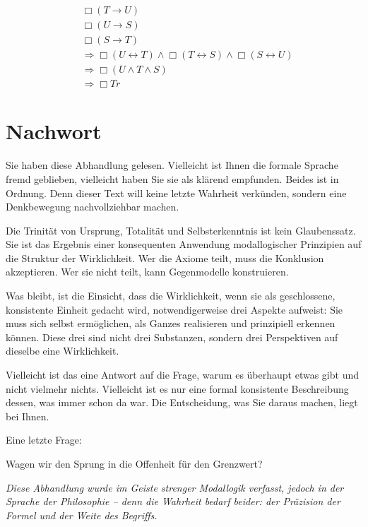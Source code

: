 \documentclass[
]{article}
\begin{document}
\[
\begin{aligned}
& \Box(T \rightarrow U) \\
& \Box(U \rightarrow S) \\
& \Box(S \rightarrow T) \\
& \Rightarrow \Box(U \leftrightarrow T) \land \Box(T \leftrightarrow S) \land \Box(S \leftrightarrow U) \\
& \Rightarrow \Box(U \land T \land S) \\
& \Rightarrow \Box Tr
\end{aligned}
\]

\section{Nachwort}\label{nachwort}

Sie haben diese Abhandlung gelesen. Vielleicht ist Ihnen die formale Sprache fremd geblieben, vielleicht haben Sie sie als klärend empfunden. Beides ist in Ordnung. Denn dieser Text will keine letzte Wahrheit verkünden, sondern eine Denkbewegung nachvollziehbar machen.

Die Trinität von Ursprung, Totalität und Selbsterkenntnis ist kein Glaubenssatz. Sie ist das Ergebnis einer konsequenten Anwendung modallogischer Prinzipien auf die Struktur der Wirklichkeit. Wer die Axiome teilt, muss die Konklusion akzeptieren. Wer sie nicht teilt, kann Gegenmodelle konstruieren.

Was bleibt, ist die Einsicht, dass die Wirklichkeit, wenn sie als geschlossene, konsistente Einheit gedacht wird, notwendigerweise drei Aspekte aufweist: Sie muss sich selbst ermöglichen, als Ganzes realisieren und prinzipiell erkennen können. Diese drei sind nicht drei Substanzen, sondern drei Perspektiven auf dieselbe eine Wirklichkeit.

Vielleicht ist das eine Antwort auf die Frage, warum es überhaupt etwas gibt und nicht vielmehr nichts. Vielleicht ist es nur eine formal konsistente Beschreibung dessen, was immer schon da war. Die Entscheidung, was Sie daraus machen, liegt bei Ihnen.

Eine letzte Frage:

Wagen wir den Sprung in die Offenheit für den Grenzwert?

\begin{center}
\emph{Diese Abhandlung wurde im Geiste strenger Modallogik verfasst, jedoch in der Sprache der Philosophie -- denn die Wahrheit bedarf beider: der Präzision der Formel und der Weite des Begriffs.}
\end{center}
\end{document}
